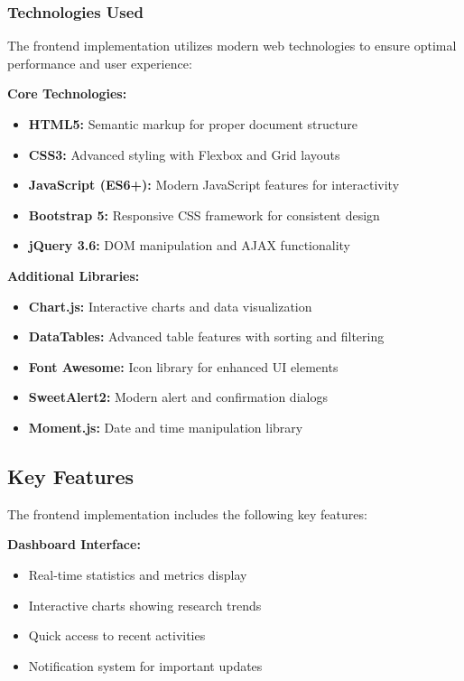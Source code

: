 \documentclass[12pt,a4paper]{article}
\begin{document}
\subsubsection{Technologies Used}
The frontend implementation utilizes modern web technologies to ensure optimal performance and user experience:

\textbf{Core Technologies:}
\begin{itemize}
    \item \textbf{HTML5:} Semantic markup for proper document structure
    \item \textbf{CSS3:} Advanced styling with Flexbox and Grid layouts
    \item \textbf{JavaScript (ES6+):} Modern JavaScript features for interactivity
    \item \textbf{Bootstrap 5:} Responsive CSS framework for consistent design
    \item \textbf{jQuery 3.6:} DOM manipulation and AJAX functionality
\end{itemize}

\textbf{Additional Libraries:}
\begin{itemize}
    \item \textbf{Chart.js:} Interactive charts and data visualization
    \item \textbf{DataTables:} Advanced table features with sorting and filtering
    \item \textbf{Font Awesome:} Icon library for enhanced UI elements
    \item \textbf{SweetAlert2:} Modern alert and confirmation dialogs
    \item \textbf{Moment.js:} Date and time manipulation library
\end{itemize}

\subsection{Key Features}
The frontend implementation includes the following key features:

\textbf{Dashboard Interface:}
\begin{itemize}
    \item Real-time statistics and metrics display
    \item Interactive charts showing research trends
    \item Quick access to recent activities
    \item Notification system for important updates
\end{itemize}
\end{document}

